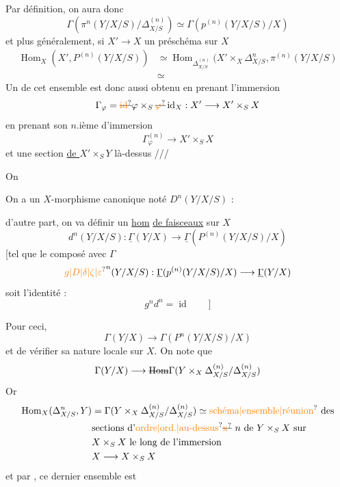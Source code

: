 Par définition, on aura donc
\[
\Gamma(\pi^n(Y/X/S)/\Delta^{(n)}_{X/S})\simeq\Gamma(p^{(n)}(Y/X/S)/X)
\]
et  plus généralement, si \inserted{$\varphi:$} $X'\longrightarrow X$ un préschéma sur $X$
\[
\begin{aligned}
\operatorname{Hom}_X(X',P^{(n)}(Y/X/S))&\simeq\operatorname{Hom}_{\Delta^{(n)}_{X/S}}(X'\times_X\Delta^n_{X/S},\pi^{(n)}(Y/X/S)\\
&\simeq
\end{aligned}
\]
Un  de cet ensemble est donc aussi obtenu en prenant l'immersion
\[
\Gamma_\varphi=\deleted{\unsure{\operatorname{id}}}\varphi\times_S\deleted{\unsure{\varphi}}\operatorname{id}_X:X'\longrightarrow X'\times_S X
\]
en prenant son $n$.ième  d'immersion
\[
\Gamma_\varphi^{(n)}\longrightarrow X'\times_S X
\]
et une section \uline{de $X'$}$\times_S Y$ là-dessus ///

On 

On a un $X$-morphisme canonique  noté $D^n(Y/X/S)$ :

d'autre part, on va définir un \uline{hom}  \uline{de faisceaux} sur $X$
\[
d^n(Y/X/S):\underline{\Gamma}(Y/X)\longrightarrow\underline{\Gamma}(P^{(n)}(Y/X/S)/X)
\]
[tel que le composé avec $\Gamma$
\[
{\unsure{g|D|\delta|\zeta|\varepsilon}}^n(Y/X/S):\underline{\Gamma}(p^{(n)}(Y/X/S)/X)\longrightarrow\underline{\Gamma}(Y/X)
\]
soit l'identité :
\[
g^n d^n=\operatorname{id}\qquad\big]
\]


Pour ceci,  
\[
\Gamma(Y/X)\longrightarrow\Gamma(P^n(Y/X/S)/X)
\]
et de vérifier sa nature locale sur $X$. On note que
\[
\Gamma(Y/X)\longrightarrow\deleted{\operatorname{Hom}}\Gamma(Y\times_X\Delta^{(n)}_{X/S}/\Delta^{(n)}_{X/S})
\]
Or
\[
\begin{aligned}
\operatorname{Hom}_X(\Delta^n_{X/S},Y)&=\Gamma(Y\times_X\Delta^{(n)}_{X/S}/\Delta^{(n)}_{X/S})\simeq\text{\unsure{schéma|ensemble|réunion} des}\\
&\text{sections d'\unsure{ordre|ord.|au-dessus}\deleted{\unsure{x}} $n$ de }Y\times_S X\text{ sur}\\
&X\times_S X\text{ le long de l'immersion}\\
&X\longrightarrow X\times_S X
\end{aligned}
\]
et par , ce dernier ensemble est

